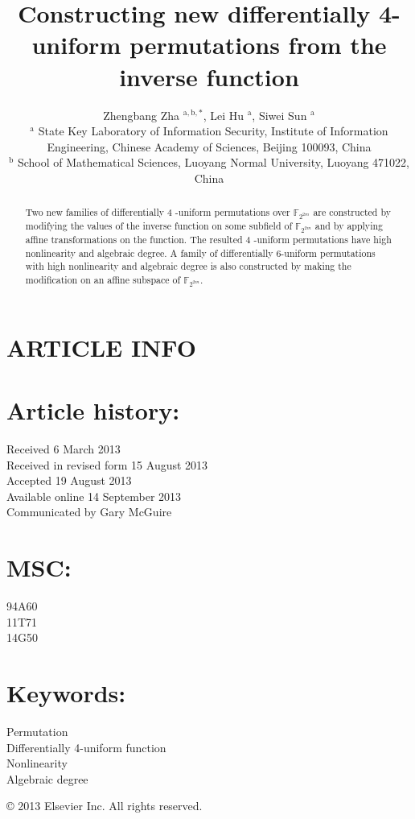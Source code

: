 \documentclass[10pt]{article}
\title{Constructing new differentially 4-uniform permutations from the inverse function }
\author{Zhengbang Zha ${ }^{\mathrm{a}, \mathrm{b}, *}$, Lei Hu ${ }^{\mathrm{a}}$, Siwei Sun ${ }^{\mathrm{a}}$\\
${ }^{\mathrm{a}}$ State Key Laboratory of Information Security, Institute of Information Engineering, Chinese Academy of Sciences, Beijing 100093, China\\
${ }^{\mathrm{b}}$ School of Mathematical Sciences, Luoyang Normal University, Luoyang 471022, China}
\date{}
\begin{document}
\maketitle
\captionsetup{singlelinecheck=false}


\section*{ARTICLE INFO}
\section*{Article history:}
Received 6 March 2013\\
Received in revised form 15 August 2013\\
Accepted 19 August 2013\\
Available online 14 September 2013\\
Communicated by Gary McGuire

\section*{MSC:}
94A60\\
11T71\\
14G50

\section*{Keywords:}
Permutation\\
Differentially 4-uniform function\\
Nonlinearity\\
Algebraic degree

\begin{abstract}
Two new families of differentially 4 -uniform permutations over $\mathbb{F}_{2^{2 m}}$ are constructed by modifying the values of the inverse function on some subfield of $\mathbb{F}_{2^{2 m}}$ and by applying affine transformations on the function. The resulted 4 -uniform permutations have high nonlinearity and algebraic degree. A family of differentially 6-uniform permutations with high nonlinearity and algebraic degree is also constructed by making the modification on an affine subspace of $\mathbb{F}_{2^{2 m}}$.
\end{abstract}

© 2013 Elsevier Inc. All rights reserved.
\end{document}

